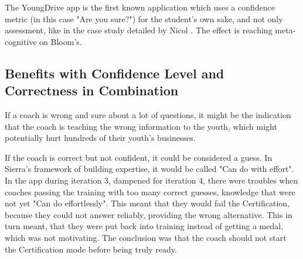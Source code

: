   The YoungDrive app is the first known application which uses a confidence metric (in this case "Are you sure?") for the student's own sake, and not only assessment, like in the case study detailed by Nicol \cite{nicol}. The effect is reaching meta-cognitive on Bloom's.





  \subsection{Benefits with Confidence Level and Correctness in Combination}
  If a coach is wrong and sure about a lot of questions, it might be the indication that the coach is teaching the wrong information to the youth, which might potentially hurt hundreds of their youth's businesses.

  If the coach is correct but not confident, it could be considered a guess. In Sierra's framework of building expertise, it would be called "Can do with effort". In the app during iteration 3, dampened for iteration 4, there were troubles when coaches passing the training with too many correct guesses, knowledge that were not yet "Can do effortlessly". This meant that they would fail the Certification, because they could not answer reliably, providing the wrong alternative. This in turn meant, that they were put back into training instead of getting a medal, which was not motivating. The conclusion was that the coach should not start the Certification mode before being truly ready.

